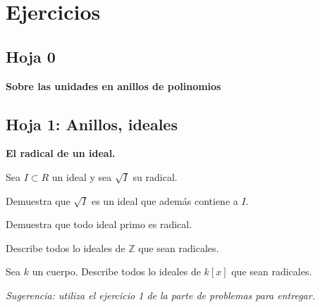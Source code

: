 \chapter{Ejercicios}
\setcounter{section}{-1} %
\section{Hoja 0}

\begin{problem}
\ppart
\ppart
\ppart
\solution
\end{problem}

\begin{problem}

\solution
\end{problem}

\begin{problem}
{\bf Sobre las unidades en anillos de polinomios}
\ppart
\ppart
\solution
\end{problem}

\begin{problem}

\solution
\end{problem}

\begin{problem}

\solution
\end{problem}

\begin{problem}
\ppart
\ppart
\ppart
\solution
\end{problem}

\begin{problem}
\ppart
\ppart
\ppart
\solution
\end{problem}

\begin{problem}
\ppart
\ppart
\ppart
\ppart
\ppart
\ppart
\ppart
\solution
\end{problem}
\section{Hoja 1: Anillos, ideales}

\begin{problem}
{\bfseries El radical de un ideal.}

Sea $I\subset R$ un ideal  y sea $\sqrt{I}$ su radical.

\ppart Demuestra que $\sqrt{I}$ es un ideal que adem\'as contiene a $I$.

\ppart Demuestra que todo ideal primo es radical.

\ppart Describe todos lo ideales de ${\mathbb Z}$ que sean radicales.

\ppart Sea $k$ un cuerpo. Describe todos lo ideales de $k[x]$ que sean radicales.

{\em Sugerencia: utiliza el ejercicio 1  de la parte de problemas para entregar.}

\solution
\end{problem}

